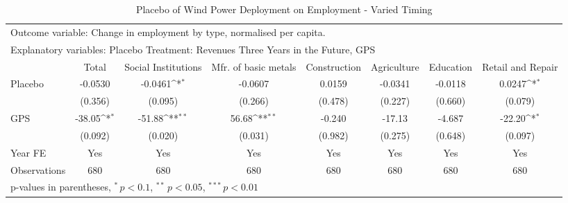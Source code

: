 \begin{table}[htbp]\centering
\def\sym#1{\ifmmode^{#1}\else\(^{#1}\)\fi}
\caption{Placebo of Wind Power Deployment on Employment - Varied Timing \label{employmentplacebo1}}
\begin{tabular*}{\hsize}{@{\hskip\tabcolsep\extracolsep\fill}l*{7}{c}}
\toprule
\multicolumn{7}{l}{\parbox{11cm}{Outcome variable: Change in employment by type, normalised per capita. }} \\ \multicolumn{7}{l}{\parbox{11cm}{Explanatory variables: Placebo Treatment: Revenues Three Years in the Future, GPS}} \\ \midrule & Total & Social Institutions & Mfr. of basic metals & Construction & Agriculture & Education & Retail and Repair \\ \toprule
\addlinespace Placebo&     -0.0530         &     -0.0461\sym{*}  &     -0.0607         &      0.0159         &     -0.0341         &     -0.0118         &      0.0247\sym{*}  \\
            &     (0.356)         &     (0.095)         &     (0.266)         &     (0.478)         &     (0.227)         &     (0.660)         &     (0.079)         \\\addlinespace
GPS         &      -38.05\sym{*}  &      -51.88\sym{**} &       56.68\sym{**} &      -0.240         &      -17.13         &      -4.687         &      -22.20\sym{*}  \\
            &     (0.092)         &     (0.020)         &     (0.031)         &     (0.982)         &     (0.275)         &     (0.648)         &     (0.097)         \\\addlinespace
\midrule
\addlinespace Year FE&         Yes         &         Yes         &         Yes         &         Yes         &         Yes         &         Yes         &         Yes         \\
\addlinespace \midrule \addlinespace Observations&         680         &         680         &         680         &         680         &         680         &         680         &         680         \\
\bottomrule
\multicolumn{8}{l}{\footnotesize p-values in parentheses, $^{*}\, p<0.1$, $^{**}\, p<0.05$, $^{***}\, p<0.01$}\\
\end{tabular*}
\end{table}
